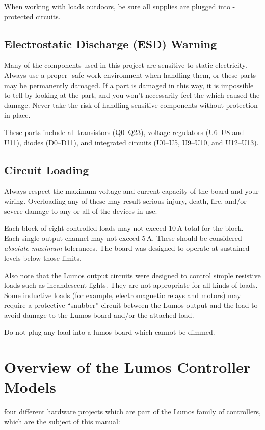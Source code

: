 \documentclass[letterpaper,twoside,onecolumn,openright,final]{memoir}
\begin{document}
When working with loads outdoors, be sure all supplies are plugged into -protected
circuits.

\section{Electrostatic Discharge (ESD) Warning}
Many of the components used in this project are sensitive to static electricity.  Always use a proper
-safe work environment when handling them, or these parts may be permanently damaged.  If
a part is damaged in this way, 
it is impossible to tell by looking at the part, and you won't necessarily
feel the  which caused the damage.  Never take the risk of handling sensitive components
without  protection in place.

These parts include all transistors (Q0--Q23), voltage regulators (U6--U8 and U11), diodes (D0--D11),
and integrated circuits (U0--U5, U9--U10, and U12--U13).

\section{Circuit Loading}
Always respect the maximum voltage and current capacity of the board and your wiring.  Overloading any
of these may result serious injury, death, fire, and/or severe damage to any or all of the devices in use.

Each block of eight controlled loads may not exceed 
10\,A total for the block.  
Each single output channel
may not exceed 5\,A.  These should be considered \emph{absolute maximum} tolerances.  The board was designed
to operate at sustained levels below those limits.

Also note that the Lumos output circuits were designed to control simple resistive loads such as
incandescent lights.  They are not appropriate for all kinds of loads.  Some inductive loads
(for example, electromagnetic relays and motors) may require a protective ``snubber'' circuit
between the Lumos output and the load to avoid damage to the Lumos board and/or the attached load.

Do not plug any load into a lumos board which cannot be dimmed.

\chapter{Overview of the Lumos Controller Models}
 four different hardware projects which are part of the Lumos
family of controllers, which are the subject of this manual:
\end{document}
